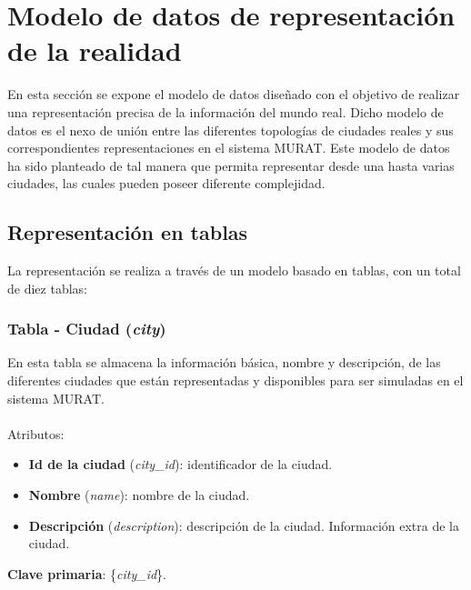 \newpage
\section{Modelo de datos de representación de la realidad}
En esta sección se expone el modelo de datos diseñado con el objetivo de realizar una representación precisa de la información del mundo real. Dicho modelo de datos es el nexo de unión entre las diferentes topologías de ciudades reales y sus correspondientes representaciones en el sistema MURAT. Este modelo de datos ha sido planteado de tal manera que permita representar desde una hasta varias ciudades, las cuales pueden poseer diferente complejidad.

\subsection{Representación en tablas}
La representación se realiza a través de un modelo basado en tablas, con un total de diez tablas:

\subsubsection{Tabla - Ciudad (\textit{city})}
En esta tabla se almacena la información básica, nombre y descripción, de las diferentes ciudades que están representadas y disponibles para ser simuladas en el sistema MURAT. \\\\
Atributos:
\begin{itemize}
    \item \textbf{Id de la ciudad} (\textit{city\_id}): identificador de la ciudad.
    \item \textbf{Nombre} (\textit{name}): nombre de la ciudad.
    \item \textbf{Descripción} (\textit{description}): descripción de la ciudad. Información extra de la ciudad.
\end{itemize}
\textbf{Clave primaria}: \{\textit{city\_id}\}. \\

